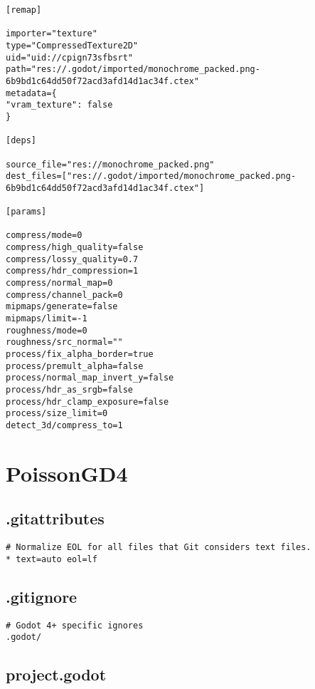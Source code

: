 \begin{lstlisting}
[remap]

importer="texture"
type="CompressedTexture2D"
uid="uid://cpign73sfbsrt"
path="res://.godot/imported/monochrome_packed.png-6b9bd1c64dd50f72acd3afd14d1ac34f.ctex"
metadata={
"vram_texture": false
}

[deps]

source_file="res://monochrome_packed.png"
dest_files=["res://.godot/imported/monochrome_packed.png-6b9bd1c64dd50f72acd3afd14d1ac34f.ctex"]

[params]

compress/mode=0
compress/high_quality=false
compress/lossy_quality=0.7
compress/hdr_compression=1
compress/normal_map=0
compress/channel_pack=0
mipmaps/generate=false
mipmaps/limit=-1
roughness/mode=0
roughness/src_normal=""
process/fix_alpha_border=true
process/premult_alpha=false
process/normal_map_invert_y=false
process/hdr_as_srgb=false
process/hdr_clamp_exposure=false
process/size_limit=0
detect_3d/compress_to=1
\end{lstlisting}

\section{PoissonGD4}


\subsection{.gitattributes}

\begin{lstlisting}
# Normalize EOL for all files that Git considers text files.
* text=auto eol=lf
\end{lstlisting}

\subsection{.gitignore}

\begin{lstlisting}
# Godot 4+ specific ignores
.godot/
\end{lstlisting}

\subsection{project.godot}

